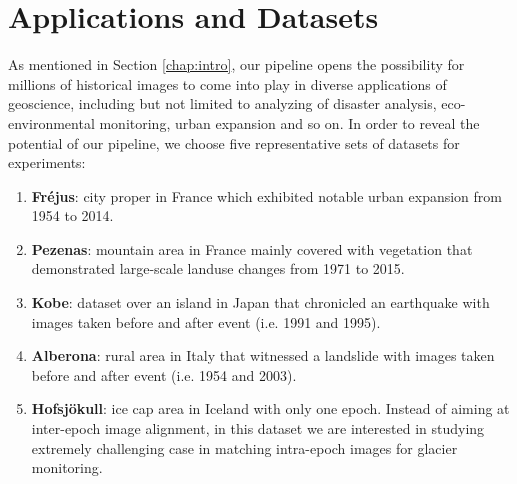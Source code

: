 
\chapter{Applications and Datasets}
\label{chap:ApplicationsAndDatasets}
As mentioned in Section \ref{chap:intro}, our pipeline opens the possibility for millions of historical images to come into play in diverse applications of geoscience, including but not limited to analyzing of disaster analysis, eco-environmental monitoring, urban expansion and so on. 
In order to reveal the potential of our pipeline, we choose five representative sets of datasets for experiments:\\
\begin{enumerate}
	\item \textbf{Fr{\'e}jus}: city proper in France which exhibited notable urban expansion from 1954 to 2014.
	\item \textbf{Pezenas}: mountain area in France mainly covered with vegetation that demonstrated large-scale landuse changes from 1971 to 2015. 
	\item \textbf{Kobe}: dataset over an island in Japan that chronicled an earthquake with images taken before and after event (i.e. 1991 and 1995).
	\item \textbf{Alberona}: rural area in Italy that witnessed a landslide with images taken before and after event (i.e. 1954 and 2003).
	\item \textbf{Hofsjökull}: ice cap area in Iceland with only one epoch. Instead of aiming at inter-epoch image alignment, in this dataset we are interested in studying extremely challenging case in matching intra-epoch images for glacier monitoring.
\end{enumerate}


%

